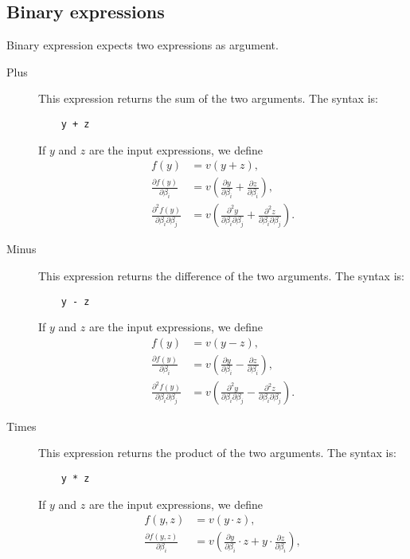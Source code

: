 \documentclass[12pt,a4paper]{article}
\begin{document}
\subsection{Binary expressions}
Binary expression expects two expressions as argument.   

\begin{description}
\item[Plus] This expression returns the sum of the two arguments. The syntax is: 
  \begin{lstlisting}
    y + z
  \end{lstlisting}
  If $y$ and $z$ are the input expressions, we define
  \begin{align*}
    f(y) &= v\left(y + z \right), \\
    \frac{\partial f(y)}{\partial \beta_i} &= v\left(\frac{\partial y}{\partial \beta_i} + \frac{\partial z}{\partial \beta_i} \right), \\
    \frac{\partial^2 f(y)}{\partial \beta_i\partial \beta_j} &=
    v\left(\frac{\partial^2 y}{\partial \beta_i \partial \beta_j} + \frac{\partial^2 z}{\partial \beta_i \partial \beta_j} \right).
  \end{align*}
\item[Minus] This expression returns the difference of the two arguments. The syntax is: 
  \begin{lstlisting}
    y - z
  \end{lstlisting}
  If $y$ and $z$ are the input expressions, we define
  \begin{align*}
    f(y) &= v\left(y - z \right), \\
    \frac{\partial f(y)}{\partial \beta_i} &= v\left(\frac{\partial y}{\partial \beta_i} - \frac{\partial z}{\partial \beta_i} \right), \\
    \frac{\partial^2 f(y)}{\partial \beta_i\partial \beta_j} &=
    v\left(\frac{\partial^2 y}{\partial \beta_i \partial \beta_j} - \frac{\partial^2 z}{\partial \beta_i \partial \beta_j} \right).
  \end{align*}
\item[Times] This expression returns the product of the two arguments. The syntax is: 
  \begin{lstlisting}
    y * z
  \end{lstlisting}
  If $y$ and $z$ are the input expressions, we define
  \begin{align*}
    f(y, z) &= v\left(y \cdot z \right), \\
    \frac{\partial f(y, z)}{\partial \beta_i} &= v\left(\frac{\partial y}{\partial \beta_i} \cdot z + y \cdot \frac{\partial z}{\partial \beta_i} \right), \\

\end{align*}
\end{description}
\end{document}
